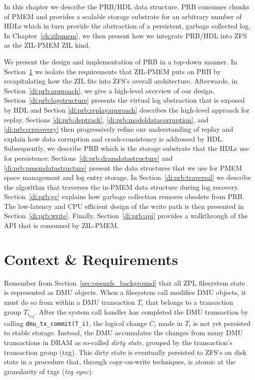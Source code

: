\documentclass[12pt,a4paper,twoside]{book}
\begin{document}
In this chapter we describe the PRB/HDL data structure.
PRB consumes chunks of PMEM and provides a scalable storage substrate for an arbitrary number of HDLs which in turn provide the abstraction of a persistent, garbage collected log.
In Chapter~\ref{ch:zilpmem}, we then present how we integrate PRB/HDL into ZFS as the ZIL-PMEM ZIL kind.

We present the design and implementation of PRB in a top-down manner.
In Section~\ref{di:prb:analysis} we isolate the requirements that ZIL-PMEM puts on PRB by recapitulating how the ZIL fits into ZFS's overall architecture.
Afterwards, in Section~\ref{di:prb:approach}, we give a high-level overview of our design.
Section~\ref{di:prb:logstructure} presents the virtual log abstraction that is exposed by HDL and Section \ref{di:prb:replayapproach} describes the high-level approach for replay.
Sections \ref{di:prb:deptrack}, \ref{di:prb:modeldatacorruption}, and \ref{di:prb:ccrecovery} then progressively refine our understanding of replay and explain how data corruption and crash-consistency is addressed by HDL.
Subsequently, we describe PRB which is the storage substrate that the HDLs use for persistence:
Sections~\ref{di:prb:dramdatastructure} and \ref{di:prb:pmemdatastructure} present the data structures that we use for PMEM space management and log entry storage.
In Section~\ref{di:prb:traversal} we describe the algorithm that traverses the in-PMEM data structure during log recovery.
Section~\ref{di:prb:gc} explains how garbage collection removes obsolete from PRB.
The low-latency and CPU efficient design of the write path is then presented in Section~\ref{di:prb:write}.
Finally, Section~\ref{di:prb:api} provides a walkthrough of the API that is consumed by ZIL-PMEM.

\section{Context \& Requirements}\label{di:prb:analysis}

Remember from Section~\ref{sec:openzfs_background} that all ZPL filesystem state is represented as DMU objects.
When a filesystem call modifies DMU objects, it must do so from within a DMU transaction $T_i$ that belongs to a transaction group $T_{i_{txg}}$.
After the system call handler has completed the DMU transaction by calling \lstinline{dmu_tx_commit(T_i)}, the logical change $C_i$ made in $T_i$ is not yet persisted to stable storage.
Instead, the DMU accumulates the changes from many DMU transactions in DRAM as so-called \textit{dirty state}, grouped by the transaction's transaction group (txg).
This dirty state is eventually persisted to ZFS's on disk state in a procedure that, through copy-on-write techniques, is atomic at the granularity of txgs (\textit{txg sync}).
\end{document}

